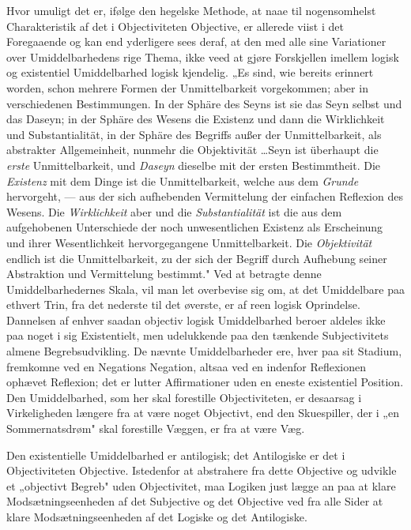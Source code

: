 \documentclass[12pt]{book}
\newcommand{\opage}[1]{\marginnote{\footnotesize\textit{[#1]}}}
\begin{document}
\opage{165} Hvor umuligt det er, ifølge den hegelske Methode, at naae til nogensomhelst Charakteristik af
det i Objectiviteten Objective, er allerede viist i det Foregaaende og kan end yderligere sees
deraf, at den med alle sine Variationer over Umiddelbarhedens rige Thema, ikke veed at gjøre
Forskjellen imellem logisk og existentiel Umiddelbarhed logisk kjendelig. „Es sind, wie
bereits erinnert worden, schon mehrere Formen der Unmittelbarkeit vorgekommen; aber in
verschiedenen Bestimmungen. In der Sphäre des Seyns ist sie das Seyn selbst und das Daseyn; in
der Sphäre des Wesens die Existenz und dann die Wirklichkeit und Substantialität, in der Sphäre
des Begriffs außer der Unmittelbarkeit, als abstrakter Allgemeinheit, nunmehr die Objektivität
\ldots Seyn ist überhaupt die \emph{erste} Unmittelbarkeit, und \emph{Daseyn} dieselbe mit der
ersten Bestimmtheit. Die \emph{Existenz} mit dem Dinge ist die Unmittelbarkeit, welche aus dem
\emph{Grunde} hervorgeht, --- aus der sich aufhebenden Vermittelung der einfachen Reflexion des
Wesens. Die \emph{Wirklichkeit} aber und die \emph{Substantialität} ist die aus dem
aufgehobenen Unterschiede der noch unwesentlichen Existenz als Erscheinung und ihrer
Wesentlichkeit hervorgegangene Unmittelbarkeit. Die \emph{Objektivität} endlich ist die
Unmittelbarkeit, zu der sich der Begriff durch Aufhebung seiner Abstraktion und Vermittelung
bestimmt." Ved at betragte denne Umiddelbarhedernes Skala, vil man let overbevise sig om, at
det Umiddelbare paa ethvert
\opage{166} Trin, fra det nederste til det øverste, er af reen logisk Oprindelse. Dannelsen af enhver
saadan objectiv logisk Umiddelbarhed beroer aldeles ikke paa noget i sig Existentielt, men
udelukkende paa den tænkende Subjectivitets almene Begrebsudvikling. De nævnte
Umiddelbarheder ere, hver paa sit Stadium, fremkomne ved en Negations Negation, altsaa ved en
indenfor Reflexionen ophævet Reflexion; det er lutter Affirmationer uden en eneste existentiel
Position. Den Umiddelbarhed, som her skal forestille Objectiviteten, er desaarsag i
Virkeligheden længere fra at være noget Objectivt, end den Skuespiller, der i „en
Sommernatsdrøm" skal forestille Væggen, er fra at være Væg.

Den existentielle Umiddelbarhed er antilogisk; det Antilogiske er det i Objectiviteten
Objective. Istedenfor at abstrahere fra dette Objective og udvikle et „objectivt Begreb" uden
Objectivitet, maa Logiken just lægge an paa at klare Modsætningseenheden af det Subjective og
det Objective ved fra alle Sider at klare Modsætningseenheden af det Logiske og det Antilogiske.
\end{document}
